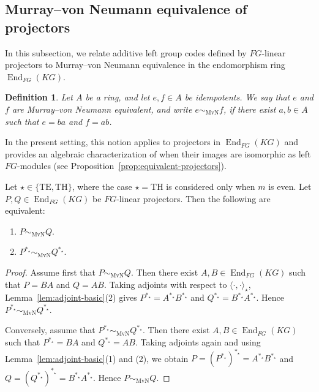 \documentclass[11pt]{article}
\newtheorem{definition}[theorem]{Definition}
\begin{document}
 \subsection{Murray--von Neumann equivalence of projectors}

In this subsection, we relate additive left group codes defined by $FG$-linear projectors to Murray--von Neumann equivalence in the endomorphism ring $\operatorname{End}_{FG}(KG)$.

\begin{definition}
Let $A$ be a ring, and let $e,f\in A$ be idempotents. We say that $e$ and $f$ are \emph{Murray--von Neumann equivalent}, and write $e\sim_{\mathrm{MvN}}f$, if there exist $a,b\in A$ such that $e=ba$ and $f=ab$.
\end{definition}

In the present setting, this notion applies to projectors in $\operatorname{End}_{FG}(KG)$ and provides an algebraic characterization of when their images are isomorphic as left $FG$-modules (see Proposition~\ref{prop:equivalent-projectors}).

\begin{lemma}\label{lem:adjoint-neu}
Let $\star\in\{\mathrm{TE},\mathrm{TH}\}$, where the case $\star=\mathrm{TH}$ is considered only when $m$ is even. Let $P,Q\in \operatorname{End}_{FG}(KG)$ be $FG$-linear projectors. Then the following are equivalent:
\begin{enumerate}
    \item $P\sim_{\mathrm{MvN}}Q$.
    \item $P^{\ast_\star}\sim_{\mathrm{MvN}}Q^{\ast_\star}$.
\end{enumerate}
\end{lemma}

\begin{proof}
Assume first that $P\sim_{\mathrm{MvN}}Q$. Then there exist $A,B\in \operatorname{End}_{FG}(KG)$ such that $P=BA$ and $Q=AB$. Taking adjoints with respect to $\langle\cdot,\cdot\rangle_\star$, Lemma~\ref{lem:adjoint-basic}(2) gives
$
P^{\ast_\star}=A^{\ast_\star}B^{\ast_\star}
$
and
$
Q^{\ast_\star}=B^{\ast_\star}A^{\ast_\star}.
$
Hence $P^{\ast_\star}\sim_{\mathrm{MvN}}Q^{\ast_\star}$.

Conversely, assume that $P^{\ast_\star}\sim_{\mathrm{MvN}}Q^{\ast_\star}$. Then there exist $A,B\in \operatorname{End}_{FG}(KG)$ such that
$
P^{\ast_\star}=BA
$
and
$
Q^{\ast_\star}=AB.
$
Taking adjoints again and using Lemma~\ref{lem:adjoint-basic}(1) and (2), we obtain
$
P=(P^{\ast_\star})^{\ast_\star}=A^{\ast_\star}B^{\ast_\star}
$
and
$
Q=(Q^{\ast_\star})^{\ast_\star}=B^{\ast_\star}A^{\ast_\star}.
$
Hence $P\sim_{\mathrm{MvN}}Q$.
\end{proof}
\end{document}
